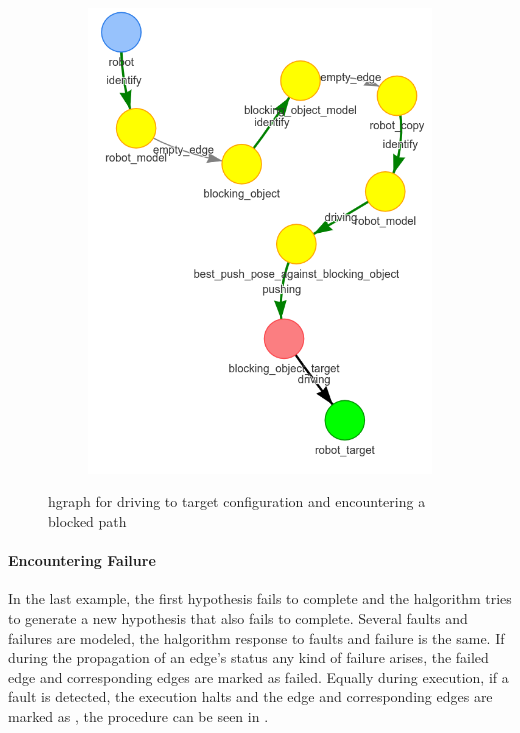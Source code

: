 \begin{figure}[H]
\begin{subfigure}{.3\textwidth}
    \caption{}\label{subfig:blocking_obj_5}
    \end{subfigure}
    \begin{subfigure}{.3\textwidth}
    \centering
    \includegraphics[width=\textwidth]{figures/connecting_nodes/blocking_obj/blocking_obj_6}
    \caption{}\label{subfig:blocking_obj_6}
    \end{subfigure}
    \caption{\ac{hgraph} for driving to target configuration and encountering a blocked path}%
    \label{fig:blocking_obj_hgraph}
\end{figure}

\paragraph{Encountering Failure}%
In the last example, the first hypothesis fails to complete and the \ac{halgorithm} tries to generate a new hypothesis that also fails to complete. Several faults and failures are modeled, the \ac{halgorithm} response to faults and failure is the same. If during the propagation of an edge's status any kind of failure arises, the failed edge and corresponding edges are marked as failed. Equally during execution, if a fault is detected, the execution halts and the edge and corresponding edges are marked as , the procedure can be seen in .\bs

